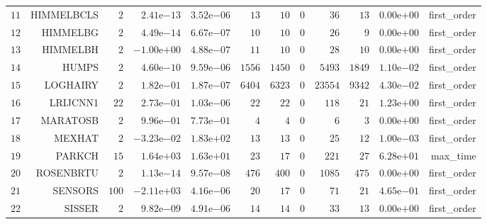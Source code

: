 \begin{longtable}{rrrrrrrrrrrr}
  \(    11\) & HIMMELBCLS & \(     2\) & \( 2.41\)e\(-13\) & \( 3.52\)e\(-06\) & \(    13\) & \(    10\) & \(     0\) & \(    36\) & \(    13\) & \( 0.00\)e\(+00\) & first\_order \\
  \(    12\) & HIMMELBG & \(     2\) & \( 4.49\)e\(-14\) & \( 6.67\)e\(-07\) & \(    10\) & \(    10\) & \(     0\) & \(    26\) & \(     9\) & \( 0.00\)e\(+00\) & first\_order \\
  \(    13\) & HIMMELBH & \(     2\) & \(-1.00\)e\(+00\) & \( 4.88\)e\(-07\) & \(    11\) & \(    10\) & \(     0\) & \(    28\) & \(    10\) & \( 0.00\)e\(+00\) & first\_order \\
  \(    14\) & HUMPS & \(     2\) & \( 4.60\)e\(-10\) & \( 9.59\)e\(-06\) & \(  1556\) & \(  1450\) & \(     0\) & \(  5493\) & \(  1849\) & \( 1.10\)e\(-02\) & first\_order \\
  \(    15\) & LOGHAIRY & \(     2\) & \( 1.82\)e\(-01\) & \( 1.87\)e\(-07\) & \(  6404\) & \(  6323\) & \(     0\) & \( 23554\) & \(  9342\) & \( 4.30\)e\(-02\) & first\_order \\
  \(    16\) & LRIJCNN1 & \(    22\) & \( 2.73\)e\(-01\) & \( 1.03\)e\(-06\) & \(    22\) & \(    22\) & \(     0\) & \(   118\) & \(    21\) & \( 1.23\)e\(+00\) & first\_order \\
  \(    17\) & MARATOSB & \(     2\) & \( 9.96\)e\(-01\) & \( 7.73\)e\(-01\) & \(     4\) & \(     4\) & \(     0\) & \(     6\) & \(     3\) & \( 0.00\)e\(+00\) & first\_order \\
  \(    18\) & MEXHAT & \(     2\) & \(-3.23\)e\(-02\) & \( 1.83\)e\(+02\) & \(    13\) & \(    13\) & \(     0\) & \(    25\) & \(    12\) & \( 1.00\)e\(-03\) & first\_order \\
  \(    19\) & PARKCH & \(    15\) & \( 1.64\)e\(+03\) & \( 1.63\)e\(+01\) & \(    23\) & \(    17\) & \(     0\) & \(   221\) & \(    27\) & \( 6.28\)e\(+01\) & max\_time \\
  \(    20\) & ROSENBRTU & \(     2\) & \( 1.13\)e\(-14\) & \( 9.57\)e\(-08\) & \(   476\) & \(   400\) & \(     0\) & \(  1085\) & \(   475\) & \( 0.00\)e\(+00\) & first\_order \\
  \(    21\) & SENSORS & \(   100\) & \(-2.11\)e\(+03\) & \( 4.16\)e\(-06\) & \(    20\) & \(    17\) & \(     0\) & \(    71\) & \(    21\) & \( 4.65\)e\(-01\) & first\_order \\
  \(    22\) & SISSER & \(     2\) & \( 9.82\)e\(-09\) & \( 4.91\)e\(-06\) & \(    14\) & \(    14\) & \(     0\) & \(    33\) & \(    13\) & \( 0.00\)e\(+00\) & first\_order \\

\end{longtable}
